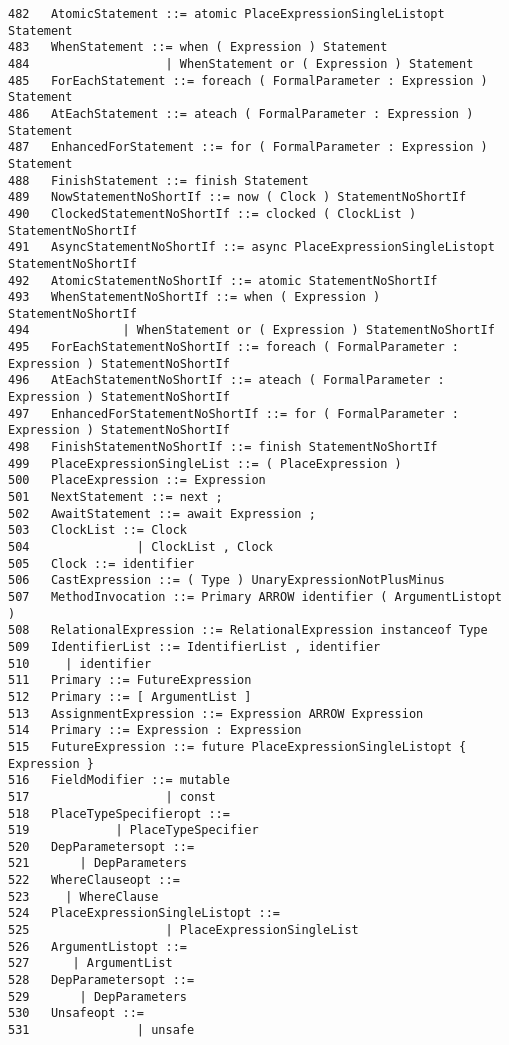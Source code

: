 {\begin{verbatim}
482   AtomicStatement ::= atomic PlaceExpressionSingleListopt Statement
483   WhenStatement ::= when ( Expression ) Statement
484                   | WhenStatement or ( Expression ) Statement
485   ForEachStatement ::= foreach ( FormalParameter : Expression ) Statement
486   AtEachStatement ::= ateach ( FormalParameter : Expression ) Statement
487   EnhancedForStatement ::= for ( FormalParameter : Expression ) Statement
488   FinishStatement ::= finish Statement
489   NowStatementNoShortIf ::= now ( Clock ) StatementNoShortIf
490   ClockedStatementNoShortIf ::= clocked ( ClockList ) StatementNoShortIf
491   AsyncStatementNoShortIf ::= async PlaceExpressionSingleListopt StatementNoShortIf
492   AtomicStatementNoShortIf ::= atomic StatementNoShortIf
493   WhenStatementNoShortIf ::= when ( Expression ) StatementNoShortIf
494             | WhenStatement or ( Expression ) StatementNoShortIf
495   ForEachStatementNoShortIf ::= foreach ( FormalParameter : Expression ) StatementNoShortIf
496   AtEachStatementNoShortIf ::= ateach ( FormalParameter : Expression ) StatementNoShortIf
497   EnhancedForStatementNoShortIf ::= for ( FormalParameter : Expression ) StatementNoShortIf
498   FinishStatementNoShortIf ::= finish StatementNoShortIf
499   PlaceExpressionSingleList ::= ( PlaceExpression )
500   PlaceExpression ::= Expression
501   NextStatement ::= next ;
502   AwaitStatement ::= await Expression ;
503   ClockList ::= Clock
504               | ClockList , Clock
505   Clock ::= identifier
506   CastExpression ::= ( Type ) UnaryExpressionNotPlusMinus
507   MethodInvocation ::= Primary ARROW identifier ( ArgumentListopt )
508   RelationalExpression ::= RelationalExpression instanceof Type
509   IdentifierList ::= IdentifierList , identifier
510     | identifier
511   Primary ::= FutureExpression
512   Primary ::= [ ArgumentList ]
513   AssignmentExpression ::= Expression ARROW Expression
514   Primary ::= Expression : Expression
515   FutureExpression ::= future PlaceExpressionSingleListopt { Expression }
516   FieldModifier ::= mutable
517                   | const
518   PlaceTypeSpecifieropt ::=
519            | PlaceTypeSpecifier
520   DepParametersopt ::=
521       | DepParameters
522   WhereClauseopt ::=
523     | WhereClause
524   PlaceExpressionSingleListopt ::=
525                   | PlaceExpressionSingleList
526   ArgumentListopt ::=
527      | ArgumentList
528   DepParametersopt ::=
529       | DepParameters
530   Unsafeopt ::=
531               | unsafe
\end{verbatim}
}
\twocolumn